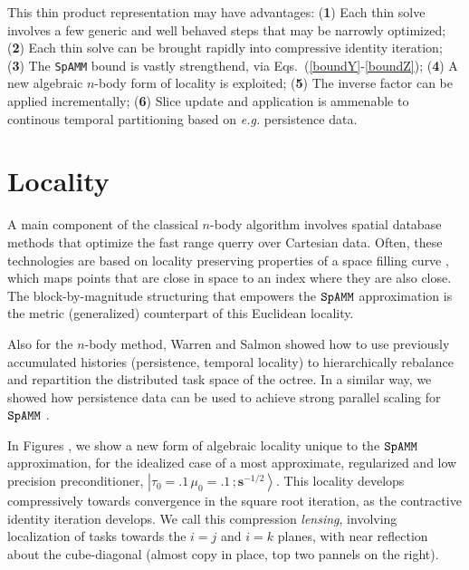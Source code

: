 \documentclass[letterpaper,twocolumn,amsmath,amsfont,amssymb,english,aps,jcp,preprintnumbers,groupaddress,nofootinbib,tightenlines,floatfix]{revtex4}
\newcommand{\mat}[1]{\boldsymbol{#1}}
\theoremstyle{plain}
\theoremstyle{remark}
\theoremstyle{plain}
\begin{document}
This thin product representation may have advantages: 
({\bf{1}}) Each thin solve involves a few generic and well behaved steps that may be narrowly optimized;
({\bf{2}}) Each thin solve can be brought rapidly into compressive identity iteration; 
({\bf{3}}) The {\tt SpAMM} bound is vastly strengthend, via Eqs.~(\ref{boundY}-\ref{boundZ}); 
({\bf{4}}) A new algebraic $n$-body form of locality is exploited; 
({\bf{5}}) The inverse factor can be applied incrementally;
({\bf{6}}) Slice update and application is ammenable to continous temporal partitioning based on {\em e.g.} persistence data.


\section{Locality} 

A main component of the classical $n$-body algorithm involves spatial database methods that 
optimize the fast range querry over Cartesian data.  Often, these technologies are
based on locality preserving properties of a space filling curve \cite{}, which maps points that are
close in space to an index where they are also close.  The block-by-magnitude structuring that empowers 
the $\tt SpAMM$ approximation is the metric (generalized) counterpart of this Euclidean locality.

Also for the $n$-body method,  Warren and Salmon showed how to use previously accumulated histories 
(persistence, temporal locality) to hierarchically rebalance and repartition  the distributed task space of the octree. 
In a similar way, we showed how persistence data can be used to achieve strong parallel scaling for $\tt SpAMM$ \cite{}.  

In Figures , we show a new form of algebraic locality unique to the $\tt SpAMM$ approximation, 
for the idealized case of a most approximate, regularized and low precision preconditioner, $\left|\tau_0=.1\,\mu_0=.1\, ; \scriptstyle{\mat{s}^{-1/2}} \right>$.
This locality develops compressively towards convergence in the square root iteration, as the contractive identity iteration develops.  
We call this compression {\em lensing},  involving localization of tasks towards the $i=j$ and $i=k$ planes,
with near reflection about the cube-diagonal (almost copy in place, top two pannels on the right).  
 
\end{document}
